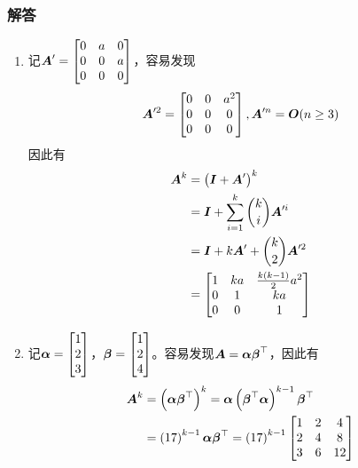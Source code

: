 \documentclass[9pt,xcolor=svgnames]{beamer} %
\begin{document}
\begin{frame}[allowframebreaks]
    \frametitle{解答}
    \begin{enumerate}
        \item 记\(\boldsymbol{A}'=\begin{bmatrix}0&a&0\\0&0&a\\0&0&0\end{bmatrix}\)，容易发现
              \begin{equation*}
                  \boldsymbol{A}'^2=\begin{bmatrix}0&0&a^2\\0&0&0\\0&0&0\end{bmatrix},\boldsymbol{A}'^n=\boldsymbol{O}(n\ge3)
              \end{equation*}
              因此有
              \begin{align*}
                  \boldsymbol{A}^k & =\left( \boldsymbol{I}+\boldsymbol{A}' \right)^k                  \\
                          & =\boldsymbol{I}+\sum_{i=1}^k\binom{k}{i}\boldsymbol{A}'^i \\
                          & =\boldsymbol{I}+k\boldsymbol{A}'+\binom{k}{2}\boldsymbol{A}'^2     \\
                          & =\begin{bmatrix}
                                 1 & ka & \frac{k(k-1)}{2}a^2 \\
                                 0 & 1  & ka                  \\
                                 0 & 0  & 1
                             \end{bmatrix}
              \end{align*}
        \item 记\(\boldsymbol{\alpha}=\begin{bmatrix}1\\2\\3\end{bmatrix}\)，\(\boldsymbol{\beta}=\begin{bmatrix}1\\2\\4\end{bmatrix}\)。容易发现\(\boldsymbol{A}=\boldsymbol{\alpha}\boldsymbol{\beta}^\top\)，因此有
              \begin{align*}
                  \boldsymbol{A}^k & =\left( \boldsymbol{\alpha}\boldsymbol{\beta}^\top \right)^k=\boldsymbol{\alpha}\left( \boldsymbol{\beta}^\top\boldsymbol{\alpha} \right)^{k-1}\boldsymbol{\beta}^\top \\
                          & =\left( 17 \right)^{k-1}\boldsymbol{\alpha}\boldsymbol{\beta}^\top=\left( 17 \right)^{k-1}
                  \begin{bmatrix}
                      1 & 2 & 4 \\2&4&8\\3&6&12
                  \end{bmatrix}
              \end{align*}
    \end{enumerate}
\end{frame}
\end{document}
